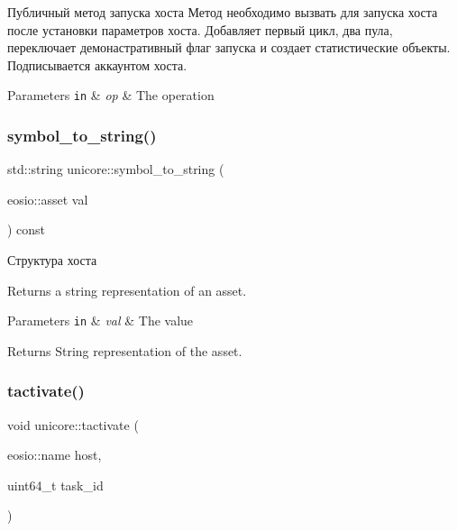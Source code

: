 Публичный метод запуска хоста Метод необходимо вызвать для запуска хоста после установки параметров хоста. Добавляет первый цикл, два пула, переключает демонастративный флаг запуска и создает статистические объекты. Подписывается аккаунтом хоста. 


\begin{DoxyParams}[1]{Parameters}
\mbox{\tt in}  & {\em op} & The operation \\
\hline
\end{DoxyParams}
\mbox{\label{classunicore_adb0134644edf42ff41b84bca15e6e8ff}} 
\subsubsection{\texorpdfstring{symbol\+\_\+to\+\_\+string()}{symbol\_to\_string()}}
{\footnotesize\ttfamily std\+::string unicore\+::symbol\+\_\+to\+\_\+string (\begin{DoxyParamCaption}\item[{eosio\+::asset}]{val }\end{DoxyParamCaption}) const}



Структура хоста 

Returns a string representation of an asset.


\begin{DoxyParams}[1]{Parameters}
\mbox{\tt in}  & {\em val} & The value\\
\hline
\end{DoxyParams}
\begin{DoxyReturn}{Returns}
String representation of the asset. 
\end{DoxyReturn}
\mbox{\label{classunicore_a0c35d9830c0c05c8f13be48b8cbdf236}} 
\subsubsection{\texorpdfstring{tactivate()}{tactivate()}}
{\footnotesize\ttfamily void unicore\+::tactivate (\begin{DoxyParamCaption}\item[{eosio\+::name}]{host,  }\item[{uint64\+\_\+t}]{task\+\_\+id }\end{DoxyParamCaption})}



